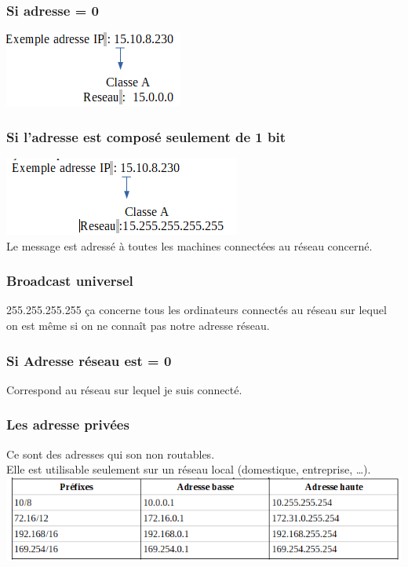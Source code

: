 \documentclass{article}
\begin{document}
\subsubsection*{Si adresse = 0}
\includegraphics{image/B1.png}
\subsubsection*{Si l'adresse est composé seulement de 1 bit}
\includegraphics{image/B2.png}\\
Le message est adressé à toutes les machines connectées au réseau concerné.
\subsubsection*{Broadcast universel}
255.255.255.255
ça concerne tous les ordinateurs connectés au réseau sur lequel on est même si on ne connaît pas notre adresse réseau.
\subsubsection*{Si Adresse réseau est = 0}
Correspond au réseau sur lequel je suis connecté.

\subsubsection{Les adresse privées}
Ce sont des adresses qui son non routables. \\
Elle est utilisable seulement sur un réseau local (domestique, entreprise, …). \\
\includegraphics{image/adresse_pv.png}
\end{document}
